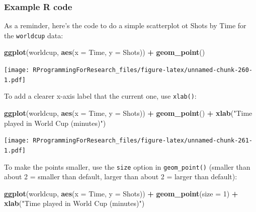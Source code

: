 \documentclass[]{book}
\makeatletter
\newenvironment{Shaded}{\begin{snugshade}}{\end{snugshade}}
\newcommand{\KeywordTok}[1]{\textcolor[rgb]{0.13,0.29,0.53}{\textbf{#1}}}
\newcommand{\DataTypeTok}[1]{\textcolor[rgb]{0.13,0.29,0.53}{#1}}
\newcommand{\DecValTok}[1]{\textcolor[rgb]{0.00,0.00,0.81}{#1}}
\newcommand{\StringTok}[1]{\textcolor[rgb]{0.31,0.60,0.02}{#1}}
\newcommand{\OperatorTok}[1]{\textcolor[rgb]{0.81,0.36,0.00}{\textbf{#1}}}
\newcommand{\NormalTok}[1]{#1}
\newenvironment{kframe}{%
\medskip{}
\setlength{\fboxsep}{.8em}
 \def\at@end@of@kframe{}%
 \ifinner\ifhmode%
  \def\at@end@of@kframe{\end{minipage}}%
  \begin{minipage}{\columnwidth}%
 \fi\fi%
 \def\FrameCommand##1{\hskip\@totalleftmargin \hskip-\fboxsep
 \colorbox{shadecolor}{##1}\hskip-\fboxsep
     \hskip-\linewidth \hskip-\@totalleftmargin \hskip\columnwidth}%
 \MakeFramed {\advance\hsize-\width
   \@totalleftmargin\z@ \linewidth\hsize
   \@setminipage}}%
 {\par\unskip\endMakeFramed%
 \at@end@of@kframe}
\renewenvironment{Shaded}{\begin{kframe}}{\end{kframe}}
\theoremstyle{definition}
\theoremstyle{definition}
\theoremstyle{definition}
\theoremstyle{remark}
\makeatother
\begin{document}
\subsubsection{Example R code}\label{example-r-code-6}

As a reminder, here's the code to do a simple scatterplot ot Shots by
Time for the \texttt{worldcup} data:

\begin{Shaded}
\begin{Highlighting}[]
\KeywordTok{ggplot}\NormalTok{(worldcup, }\KeywordTok{aes}\NormalTok{(}\DataTypeTok{x =}\NormalTok{ Time, }\DataTypeTok{y =}\NormalTok{ Shots)) }\OperatorTok{+}
\StringTok{        }\KeywordTok{geom_point}\NormalTok{()}
\end{Highlighting}
\end{Shaded}

\texttt{[image: RProgrammingForResearch\_files/figure-latex/unnamed-chunk-260-1.pdf]}

To add a clearer x-axis label that the current one, use \texttt{xlab()}:

\begin{Shaded}
\begin{Highlighting}[]
\KeywordTok{ggplot}\NormalTok{(worldcup, }\KeywordTok{aes}\NormalTok{(}\DataTypeTok{x =}\NormalTok{ Time, }\DataTypeTok{y =}\NormalTok{ Shots)) }\OperatorTok{+}
\StringTok{        }\KeywordTok{geom_point}\NormalTok{() }\OperatorTok{+}\StringTok{ }
\StringTok{        }\KeywordTok{xlab}\NormalTok{(}\StringTok{"Time played in World Cup (minutes)"}\NormalTok{)}
\end{Highlighting}
\end{Shaded}

\texttt{[image: RProgrammingForResearch\_files/figure-latex/unnamed-chunk-261-1.pdf]}

To make the points smaller, use the \texttt{size} option in
\texttt{geom\_point()} (smaller than about 2 = smaller than default,
larger than about 2 = larger than default):

\begin{Shaded}
\begin{Highlighting}[]
\KeywordTok{ggplot}\NormalTok{(worldcup, }\KeywordTok{aes}\NormalTok{(}\DataTypeTok{x =}\NormalTok{ Time, }\DataTypeTok{y =}\NormalTok{ Shots)) }\OperatorTok{+}
\StringTok{        }\KeywordTok{geom_point}\NormalTok{(}\DataTypeTok{size =} \DecValTok{1}\NormalTok{)  }\OperatorTok{+}\StringTok{ }
\StringTok{        }\KeywordTok{xlab}\NormalTok{(}\StringTok{"Time played in World Cup (minutes)"}\NormalTok{)}
\end{Highlighting}
\end{Shaded}
\end{document}
